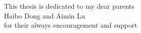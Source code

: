 \begin{dedication}
This thesis is dedicated to my dear parents\\
  Haibo Dong and Aimin Lu
 \\
for their always encouragement and support\\
\end{dedication}
